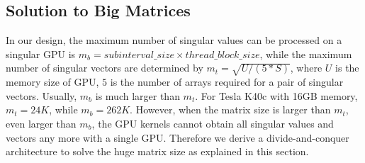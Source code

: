 
\vspace{-0.1in}
\subsection{Solution to Big Matrices} \label{sec_huge}
\vspace{-0.1in}
In our design, the maximum number of singular values can be processed on a singular GPU is $m_b = subinterval\_size \times thread\_block\_size$,
while the maximum number of singular vectors are determined by $m_t = \sqrt{U / (5 * S)}$,
where $U$ is the memory size of GPU, $5$ is the number of arrays required for a pair of singular vectors.
Usually, $m_b$ is much larger than $m_t$.
For Tesla K40c with 16GB memory, $m_t = 24K$, while $m_b = 262K$.
However, when the matrix size is larger than $m_t$, even larger than $m_b$,
the GPU kernels cannot obtain all singular values and vectors any more with a single GPU.
Therefore we derive a divide-and-conquer architecture to solve the huge matrix size as explained in this section.

